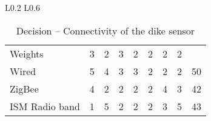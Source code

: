 \begin{table}[H]
\begin{tabular}{L{0.2\textwidth} L{0.6\textwidth}}
		\begin{tabular}{l|lllllll|l}
		               & \rot{Reliability} & \rot{Resilience} & \rot{Performance} & \rot{Interoperability} & \rot{Security} & \rot{Scalability} & \rot{Cost} & \rot{\textbf{Score}} \\ \hline
		Weights        & 3 & 2 & 3 & 2 & 2 & 2 & 2 \\ \hline
		Wired          & 5 & 4 & 3 & 3 & 2 & 2 & 2 & 50 \\ 
		ZigBee         & 4 & 2 & 2 & 2 & 2 & 4 & 3 & 42 \\
		ISM Radio band & 1 & 5 & 2 & 2 & 2 & 3 & 5 & 43 \\
	\end{tabular} \\
	\\ \bottomrule
	\end{tabular}
	\caption{Decision -- Connectivity of the dike sensor}
	\label{table:linux}
\end{table}

